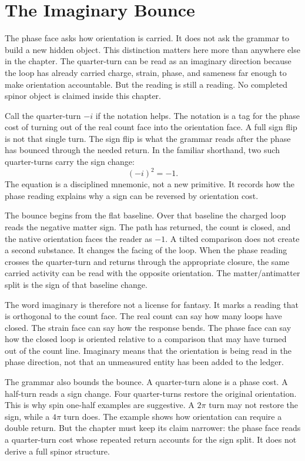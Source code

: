 \section{The Imaginary Bounce}

The phase face asks how orientation is carried. It does not ask the grammar
to build a new hidden object. This distinction matters here more than
anywhere else in the chapter. The quarter-turn can be read as an imaginary
direction because the loop has already carried charge, strain, phase, and
sameness far enough to make orientation accountable. But the reading is still
a reading. No completed spinor object is claimed inside this chapter.

Call the quarter-turn \(-i\) if the notation helps. The notation is a tag for
the phase cost of turning out of the real count face into the orientation
face. A full sign flip is not that single turn. The sign flip is what the
grammar reads after the phase has bounced through the needed return. In the
familiar shorthand, two such quarter-turns carry the sign change:
\[
  (-i)^2 = -1 .
\]
The equation is a disciplined mnemonic, not a new primitive. It records how
the phase reading explains why a sign can be reversed by orientation cost.

The bounce begins from the flat baseline. Over that baseline the charged loop
reads the negative matter sign. The path has returned, the count is closed,
and the native orientation faces the reader as \(-1\). A tilted comparison
does not create a second substance. It changes the facing of the loop. When
the phase reading crosses the quarter-turn and returns through the
appropriate closure, the same carried activity can be read with the opposite
orientation. The matter/antimatter split is the sign of that baseline change.

The word imaginary is therefore not a license for fantasy. It marks a
reading that is orthogonal to the count face. The real count can say how many
loops have closed. The strain face can say how the response bends. The phase
face can say how the closed loop is oriented relative to a comparison that
may have turned out of the count line. Imaginary means that the orientation
is being read in the phase direction, not that an unmeasured entity has been
added to the ledger.

The grammar also bounds the bounce. A quarter-turn alone is a phase cost. A
half-turn reads a sign change. Four quarter-turns restore the original
orientation. This is why spin one-half examples are suggestive. A \(2\pi\)
turn may not restore the sign, while a \(4\pi\) turn does. The example shows
how orientation can require a double return. But the chapter must keep its
claim narrower: the phase face reads a quarter-turn cost whose repeated
return accounts for the sign split. It does not derive a full spinor
structure.

